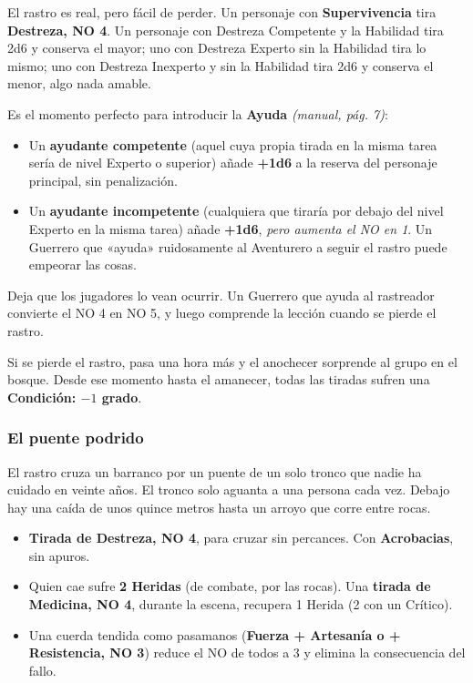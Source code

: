 \documentclass[10pt,a4paper]{article}
\newcommand{\tightlist}{\setlength{\itemsep}{0pt}\setlength{\parskip}{0pt}}
\begin{document}
El rastro es real, pero fácil de perder. Un personaje con \textbf{Supervivencia} tira \textbf{Destreza, NO 4}. Un personaje con Destreza Competente y la Habilidad tira 2d6 y conserva el mayor; uno con Destreza Experto sin la Habilidad tira lo mismo; uno con Destreza Inexperto y sin la Habilidad tira 2d6 y conserva el menor, algo nada amable.

Es el momento perfecto para introducir la \textbf{Ayuda} \emph{(manual, pág. 7)}:

\begin{itemize}
\tightlist
\item
  Un \textbf{ayudante competente} (aquel cuya propia tirada en la misma tarea sería de nivel Experto o superior) añade \textbf{+1d6} a la reserva del personaje principal, sin penalización.
\item
  Un \textbf{ayudante incompetente} (cualquiera que tiraría por debajo del nivel Experto en la misma tarea) añade \textbf{+1d6}, \emph{pero aumenta el NO en 1}. Un Guerrero que «ayuda» ruidosamente al Aventurero a seguir el rastro puede empeorar las cosas.
\end{itemize}

Deja que los jugadores lo vean ocurrir. Un Guerrero que ayuda al rastreador convierte el NO 4 en NO 5, y luego comprende la lección cuando se pierde el rastro.

Si se pierde el rastro, pasa una hora más y el anochecer sorprende al grupo en el bosque. Desde ese momento hasta el amanecer, todas las tiradas sufren una \textbf{Condición: $-1$ grado}.

\subsubsection{El puente podrido}\label{el-puente-podrido}

El rastro cruza un barranco por un puente de un solo tronco que nadie ha cuidado en veinte años. El tronco solo aguanta a una persona cada vez. Debajo hay una caída de unos quince metros hasta un arroyo que corre entre rocas.

\begin{itemize}
\tightlist
\item
  \textbf{Tirada de Destreza, NO 4}, para cruzar sin percances. Con \textbf{Acrobacias}, sin apuros.
\item
  Quien cae sufre \textbf{2 Heridas} (de combate, por las rocas). Una \textbf{tirada de Medicina, NO 4}, durante la escena, recupera 1 Herida (2 con un Crítico).
\item
  Una cuerda tendida como pasamanos (\textbf{Fuerza + Artesanía o + Resistencia, NO 3}) reduce el NO de todos a 3 y elimina la consecuencia del fallo.
\end{itemize}
\end{document}
